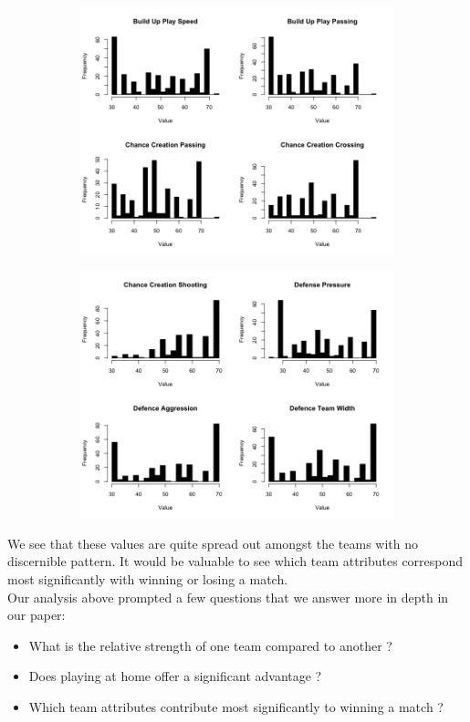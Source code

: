 \documentclass{article}
\begin{document}
\begin{figure}[H]
\centering
\begin{subfigure}{.5\textwidth}
  \centering
  \includegraphics[width=.8\linewidth]{hist1.png}
  \label{fig:sub1}
\end{subfigure}%
\begin{subfigure}{.5\textwidth}
  \centering
  \includegraphics[width=.8\linewidth]{hist2.png}
  \label{fig:sub2}
\end{subfigure}
\end{figure}

We see that these values are quite spread out amongst the teams with no discernible pattern. It would be valuable to see which team attributes correspond most significantly with winning or losing a match.\\

Our analysis above prompted a few questions that we answer more in depth in our paper:

\begin{itemize}
	\item What is the relative strength of one team compared to another ?
	\item Does playing at home offer a significant advantage ?
	\item Which team attributes contribute most significantly to winning a match ?
\end{itemize}
\end{document}
